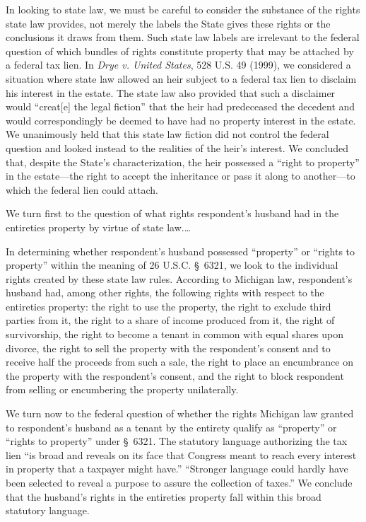 In looking to state law, we must be careful to consider the substance of the
rights state law provides, not merely the labels the State gives these rights
or the conclusions it draws from them. Such state law labels are irrelevant to
the federal question of which bundles of rights constitute property that may be
attached by a federal tax lien. In \emph{Drye v. United States}, 528 U.S. 49
(1999), we considered a situation where state law allowed an heir subject to a
federal tax lien to disclaim his interest in the estate. The state law also
provided that such a disclaimer would ``creat[e] the legal fiction'' that the
heir had predeceased the decedent and would correspondingly be deemed to have
had no property interest in the estate. We unanimously held that this state law
fiction did not control the federal question and looked instead to the realities
of the heir's interest. We concluded that, despite the State's characterization,
the heir possessed a ``right to property'' in the estate---the right to accept
the inheritance or pass it along to another---to which the federal lien could
attach.


We turn first to the question of what rights respondent's husband had in the
entireties property by virtue of state law.\dots

In determining whether respondent's husband possessed ``property'' or ``rights
to property'' within the meaning of 26 U.S.C. \S~6321, we look to the
individual rights created by these state law rules. According to Michigan law,
respondent's husband had, among other rights, the following rights with respect
to the entireties property: the right to use the property, the right to exclude
third parties from it, the right to a share of income produced from it, the
right of survivorship, the right to become a tenant in common with equal shares
upon divorce, the right to sell the property with the respondent's consent and
to receive half the proceeds from such a sale, the right to place an
encumbrance on the property with the respondent's consent, and the right to
block respondent from selling or encumbering the property unilaterally.


We turn now to the federal question of whether the rights Michigan law granted
to respondent's husband as a tenant by the entirety qualify as ``property'' or
``rights to property'' under \S~6321. The statutory language authorizing the
tax lien ``is broad and reveals on its face that Congress meant to reach every
interest in property that a taxpayer might have.'' ``Stronger language could
hardly have been selected to reveal a purpose to assure the collection of
taxes.'' We conclude that the husband's rights in the entireties property fall
within this broad statutory language.

